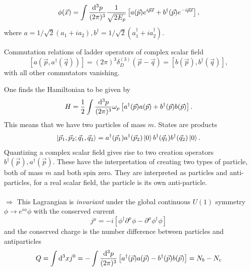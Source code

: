 \begin{equation}
	\phi(\vec{x})= \int  \frac{\mathrm{d}^3 p}{(2 \pi)^3} \frac{1}{\sqrt{2 E_p}} \left[a(\vec{p}) e^{i \vec{p} \vec{x}} + b^{\dagger}( \vec{p}) e^{- i \vec{p}\vec{x}} \right],
\end{equation}
where $a=1/\sqrt{2} (a_1 +i a_2), b^{\dagger}=1/\sqrt{2}(a^{\dagger}_1 + i a^{\dagger}_2)$.
\begin{mybox}{Commutation relations of ladder operators of complex scalar field}
	\begin{equation}
	\left[a(\vec{p}, a^{\dagger}(\vec{q}))\right]= (2 \pi)^3 \delta^{(3)}_D (\vec{p}-\vec{q}) = \left[b(\vec{p}), b^{\dagger}(\vec{q})\right],
	\end{equation}
	with all other commutators vanishing.
\end{mybox}
One finds the Hamiltonian to be given by
\begin{equation}
	H =\frac{1}{2} \int \frac{\mathrm{d}^3 p}{(2 \pi)^3} \omega_p \left[a^\dagger(\vec{p})a(\vec{p}) + b^\dagger(\vec{p}) b(\vec{p})\right] .
	\end{equation}
	This means that we have two particles of mass $m$. States are products
	\begin{equation}
		\ket{\vec{p}_1,\vec{p}_2 ; \vec{q}_1,\vec{q}_2} = a^\dagger(\vec{p}_1) a^\dagger(\vec{p}_2) \ket{0} b^\dagger(\vec{q}_1) b^\dagger(\vec{q}_2)  \ket{0}.
	\end{equation}
Quantizing a complex scalar field gives rise to two creation operators $b^{\dagger}(\vec{p}), a^{\dagger} (\vec{p})$. These have the interpretation of creating two types of particle, both of mass $m$ and both spin zero. They are interpreted as particles and anti-particles, for a real scalar field, the particle is its own anti-particle.\\
\\
$\Rightarrow$ This Lagrangian is \emph{invariant} under the global continuous $U(1)$ symmetry $\phi \rightarrow e^{i \alpha} \phi$ with the conserved current 
\begin{equation}
	j^{\mu} = -i \left[\phi^{\dagger} \partial^{\mu} \phi - \partial^{\mu} \phi^{\dagger} \phi\right]
\end{equation}
and the conserved charge is the number difference between particles and antiparticles
\begin{equation}
	Q = \int \mathrm{d}^3 x j^0 = - \int \frac{\mathrm{d}^3 p}{(2 \pi)^3} \left[a^{\dagger}(\vec{p}) a(\vec{p}) - b^{\dagger}(\vec{p}) b(\vec{p}) \right] = N_b - N_c
\end{equation}
